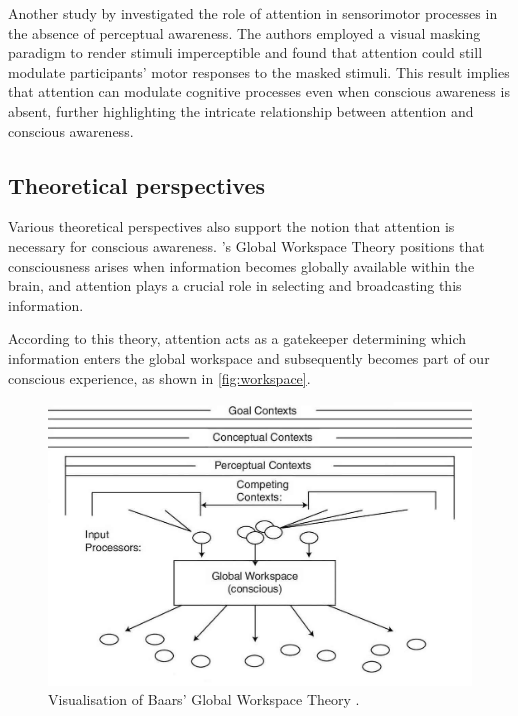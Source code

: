 \documentclass[10pt]{article}
\begin{document}
\begin{sloppypar}
  Another study by \cite{sumner_attentional_2006} investigated the role of attention in sensorimotor processes in the absence of perceptual awareness. The authors employed a visual masking paradigm to render stimuli imperceptible and found that attention could still modulate participants’ motor responses to the masked stimuli. This result implies that attention can modulate cognitive processes even when conscious awareness is absent, further highlighting the intricate relationship between attention and conscious awareness.

  \subsection{Theoretical perspectives}
  \label{sec:theoretical}

  Various theoretical perspectives also support the notion that attention is necessary for conscious awareness. \citeauthor{baars_essential_1997}’s \citeyearpar{baars_essential_1997} Global Workspace Theory positions that consciousness arises when information becomes globally available within the brain, and attention plays a crucial role in selecting and broadcasting this information.

  \newpage

  According to this theory, attention acts as a gatekeeper determining which information enters the global workspace and subsequently becomes part of our conscious experience, as shown in \autoref{fig:workspace}.

  \begin{figure}[ht]
    \centering
    \includegraphics[width=\textwidth]{figures/global-workspace.jpg}
    \caption[Visualisation of Baars’ Global Workspace Theory.]{Visualisation of Baars’ Global Workspace Theory \citep{sun_computational_2007}.}
    \label{fig:workspace}
  \end{figure}


\end{sloppypar}
\end{document}

